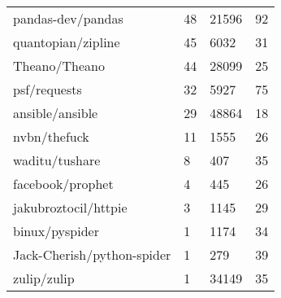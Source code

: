 \begin{multicols*}{2}
\begin{center}
\begin{supertabular}{llll}
pandas-dev/pandas & 48 & 21596 & 92 \\
quantopian/zipline & 45 & 6032 & 31 \\
Theano/Theano & 44 & 28099 & 25 \\
psf/requests & 32 & 5927 & 75 \\
ansible/ansible & 29 & 48864 & 18 \\
nvbn/thefuck & 11 & 1555 & 26 \\
waditu/tushare & 8 & 407 & 35 \\
facebook/prophet & 4 & 445 & 26 \\
jakubroztocil/httpie & 3 & 1145 & 29 \\
binux/pyspider & 1 & 1174 & 34 \\
Jack-Cherish/python-spider & 1 & 279 & 39 \\
zulip/zulip & 1 & 34149 & 35 \\
\bottomrule
\end{supertabular}
\end{center}
\end{multicols*}


\renewcommand{\arraystretch}{\oldarraystretch}